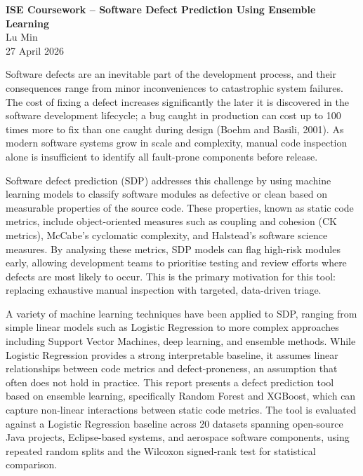 \documentclass[10pt, a4paper]{article}
\makeatletter
\renewcommand\section{\@startsection{section}{1}{\z@}{0.8em}{0.1em}{\normalfont\Large\bfseries}}
\makeatother
\begin{document}
\begin{center}
{\Large\bfseries ISE Coursework -- Software Defect Prediction Using Ensemble Learning}\\[0.4em]
Lu Min\\[0.2em]
27 April 2026
\end{center}
\vspace{0.3em}

\section{Introduction}

Software defects are an inevitable part of the development process, and their consequences range from minor inconveniences to catastrophic system failures. The cost of fixing a defect increases significantly the later it is discovered in the software development lifecycle; a bug caught in production can cost up to 100 times more to fix than one caught during design (Boehm and Basili, 2001). As modern software systems grow in scale and complexity, manual code inspection alone is insufficient to identify all fault-prone components before release.

Software defect prediction (SDP) addresses this challenge by using machine learning models to classify software modules as defective or clean based on measurable properties of the source code. These properties, known as static code metrics, include object-oriented measures such as coupling and cohesion (CK metrics), McCabe's cyclomatic complexity, and Halstead's software science measures. By analysing these metrics, SDP models can flag high-risk modules early, allowing development teams to prioritise testing and review efforts where defects are most likely to occur. This is the primary motivation for this tool: replacing exhaustive manual inspection with targeted, data-driven triage.

A variety of machine learning techniques have been applied to SDP, ranging from simple linear models such as Logistic Regression to more complex approaches including Support Vector Machines, deep learning, and ensemble methods. While Logistic Regression provides a strong interpretable baseline, it assumes linear relationships between code metrics and defect-proneness, an assumption that often does not hold in practice. This report presents a defect prediction tool based on ensemble learning, specifically Random Forest and XGBoost, which can capture non-linear interactions between static code metrics. The tool is evaluated against a Logistic Regression baseline across 20 datasets spanning open-source Java projects, Eclipse-based systems, and aerospace software components, using repeated random splits and the Wilcoxon signed-rank test for statistical comparison.
\end{document}
